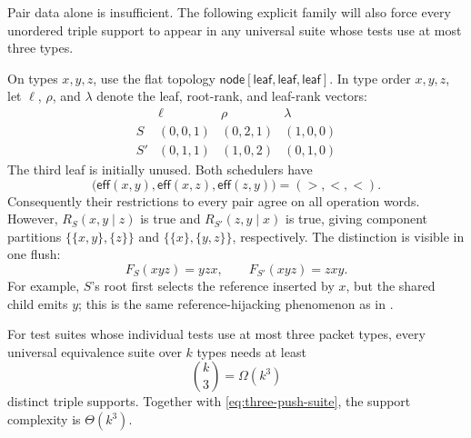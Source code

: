 Pair data alone is insufficient.  The following explicit family will also
force every unordered triple support to appear in any universal suite whose
tests use at most three types.

\begin{example}
\label{ex:cubic-support-witness}
On types \(x,y,z\), use the flat topology
\(\mathsf{node}[\mathsf{leaf},\mathsf{leaf},\mathsf{leaf}]\).  In type order
\(x,y,z\), let \(\ell\), \(\rho\), and \(\lambda\) denote the leaf, root-rank,
and leaf-rank vectors:
\begin{equation}
\begin{array}{c|ccc}
 & \ell & \rho & \lambda\\
\hline
 S  &(0,0,1)&(0,2,1)&(1,0,0)\\
 S' &(0,1,1)&(1,0,2)&(0,1,0)
\end{array}
\label{eq:cubic-support-witness}
\end{equation}
The third leaf is initially unused.  Both schedulers have
\begin{equation}
 \bigl(\mathsf{eff}(x,y),\mathsf{eff}(x,z),
       \mathsf{eff}(z,y)\bigr)=(>,<,<).
 \label{eq:cubic-support-effective}
\end{equation}
Consequently their restrictions to every pair agree on all operation words.
However, \(R_S(x,y\mid z)\) is true and
\(R_{S'}(z,y\mid x)\) is true, giving component partitions
\(\{\{x,y\},\{z\}\}\) and \(\{\{x\},\{y,z\}\}\), respectively.  The
distinction is visible in one flush:
\begin{equation}
  F_S(xyz)=yzx,
  \qquad
  F_{S'}(xyz)=zxy.
  \label{eq:cubic-support-distinguishing-flush}
\end{equation}
For example, \(S\)'s root first selects the reference inserted by \(x\), but
the shared child emits \(y\); this is the same reference-hijacking phenomenon
as in .
\end{example}

\begin{theorem}
\label{thm:support-lower-bound}
For test suites whose individual tests use at most three packet types, every
universal equivalence suite over \(k\) types needs at least
\begin{equation}
  \binom{k}{3}=\Omega(k^3)
  \label{eq:support-lower-bound}
\end{equation}
distinct triple supports.  Together with \autoref{eq:three-push-suite}, the
support complexity is \(\Theta(k^3)\).
\end{theorem}

